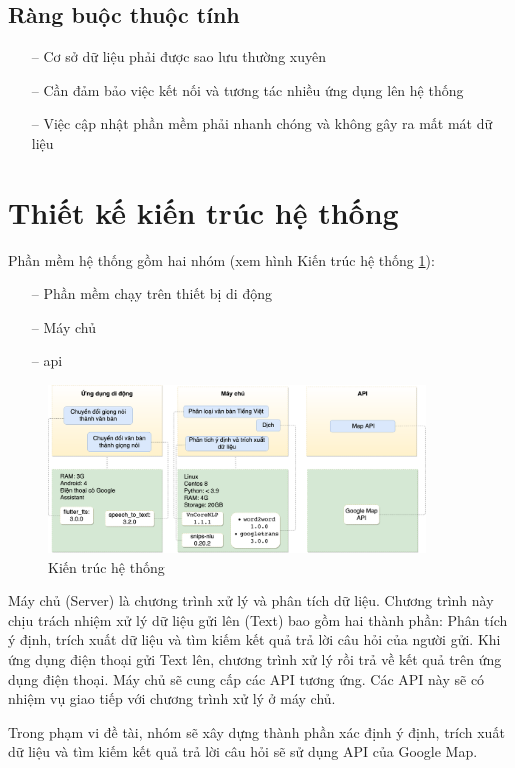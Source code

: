 \subsection{Ràng buộc thuộc tính}
\begin{itemize}
    \item[--] Cơ sở dữ liệu phải được sao lưu thường xuyên
    \item[--] Cần đảm bảo việc kết nối và tương tác nhiều ứng dụng lên hệ thống
    \item[--] Việc cập nhật phần mềm phải nhanh chóng và không gây ra mất mát dữ liệu
\end{itemize}

\section{Thiết kế kiến trúc hệ thống}
Phần mềm hệ thống gồm hai nhóm (xem hình Kiến trúc hệ thống \ref{fig:kien-truc-he-thong}):
\begin{itemize}
    \item[--] Phần mềm chạy trên thiết bị di động
    \item[--] Máy chủ
    \item[--] \ac{api}
\end{itemize}
\begin{figure}[htp]
    \centering
    \includegraphics[width=10cm]{images/Structure-System.png}
    \caption{Kiến trúc hệ thống}
    \label{fig:kien-truc-he-thong}
\end{figure}

Máy chủ (Server) là chương trình xử lý và phân tích dữ liệu. Chương trình này chịu trách nhiệm xử lý dữ liệu gửi lên (Text) bao gồm hai thành phần: Phân tích ý định, trích xuất dữ liệu và tìm kiếm kết quả trả lời câu hỏi của người gửi. Khi ứng dụng điện thoại gửi Text lên, chương trình xử lý rồi trả về kết quả trên ứng dụng điện thoại. Máy chủ sẽ cung cấp các API tương ứng. Các API này sẽ có nhiệm vụ giao tiếp với chương trình xử lý ở máy chủ.

Trong phạm vi đề tài, nhóm sẽ xây dựng thành phần xác định ý định, trích xuất dữ liệu và tìm kiếm kết quả trả lời câu hỏi sẽ sử dụng API của Google Map\cite{google-map}. 

